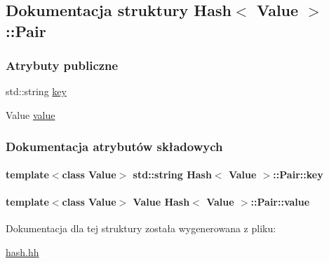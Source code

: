 \hypertarget{struct_hash_1_1_pair}{\subsection{Dokumentacja struktury Hash$<$ Value $>$\-:\-:Pair}
\label{struct_hash_1_1_pair}
}
\subsubsection*{Atrybuty publiczne}
\begin{DoxyCompactItemize}
\item 
std\-::string \hyperlink{struct_hash_1_1_pair_a9c9c048d412d1c58548f58d2b6f4ae46}{key}
\item 
Value \hyperlink{struct_hash_1_1_pair_a13f0b360cbb75f127e78b4d9dc34a2ed}{value}
\end{DoxyCompactItemize}


\subsubsection{Dokumentacja atrybutów składowych}
\hypertarget{struct_hash_1_1_pair_a9c9c048d412d1c58548f58d2b6f4ae46}{
\paragraph[{key}]{\setlength{\rightskip}{0pt plus 5cm}template$<$class Value$>$ std\-::string {\bf Hash}$<$ Value $>$\-::Pair\-::key}}\label{struct_hash_1_1_pair_a9c9c048d412d1c58548f58d2b6f4ae46}
\hypertarget{struct_hash_1_1_pair_a13f0b360cbb75f127e78b4d9dc34a2ed}{
\paragraph[{value}]{\setlength{\rightskip}{0pt plus 5cm}template$<$class Value$>$ Value {\bf Hash}$<$ Value $>$\-::Pair\-::value}}\label{struct_hash_1_1_pair_a13f0b360cbb75f127e78b4d9dc34a2ed}


Dokumentacja dla tej struktury została wygenerowana z pliku\-:\begin{DoxyCompactItemize}
\item 
\hyperlink{hash_8hh}{hash.\-hh}\end{DoxyCompactItemize}
